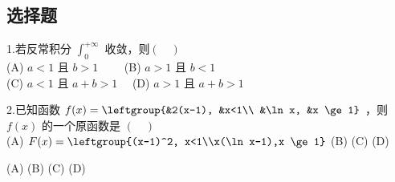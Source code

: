 
\subsection{选择题}
1.若反常积分 $\int_{0}^{+\infty}$ 收敛，则$(\quad)$\\
(A) $a<1$ 且 $b>1 \qquad$
(B) $a>1$ 且 $b<1$\\
(C) $a<1$ 且 $a+b>1 \quad$
(D) $a>1$ 且 $a+b>1$

 2.已知函数 $f(x)=\leftgroup{&2(x-1), &x<1\\ &\ln x, &x \ge 1}$ ，则 $f(x)$ 的一个原函数是  $(\quad)$\\
(A) $F(x)=\leftgroup{(x-1)^2, x<1\\x(\ln x-1),x \ge 1}$
(B)
(C)
(D) 


(A)
(B)
(C)
(D) 




